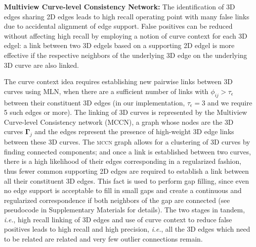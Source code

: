 \documentclass[a4paper,titlepage]{article}
\newcommand{\ie}{{\it i.e.}}
\newcommand{\Gama}{\boldsymbol{\Gamma}}
\newcommand{\mccn}{\textsc{mccn}\xspace}
\begin{document}

\textbf{Multiview Curve-level Consistency Network:}
The identification of 3D edges sharing 2D edges leads to
high recall operating point with many false links due to accidental alignment of
edge support. False positives can be reduced without affecting high
recall by employing a notion of curve context for each 3D edgel: a link
between two 3D edgels based on a supporting 2D edgel is more effective if
the respective neighbors of the underlying 3D edge on the underlying 3D curve
are also linked. 

The curve context idea requires establishing new pairwise links between 3D
curves using MLN, when there are a sufficient number of links with
$\phi_{ij}>\tau_{\epsilon}$ between their constituent 3D edges (in our
implementation, $\tau_{\epsilon}=3$ and we require 5 such edges or more). The
linking of 3D curves is represented by the Multiview Curve-level Consistency
network (MCCN), a graph whose nodes are the 3D curves $\Gama_j$ and the edges
represent the presence of high-weight 3D edge links between these 3D curves. The
\mccn graph allows for a clustering of 3D curves by finding connected
components; and once a link is established between two curves, there is a high
likelihood of their edges corresponding in a regularized fashion, thus
fewer common supporting 2D edges are required to establish a link between all
their constituent 3D edges. This fact is used to perform gap filling, since even
no edge support is acceptable to fill in small gaps and create a continuous and
regularized correspondence if both neighbors of the gap are connected (see
pseudocode in Supplementary Materials for details). The two stages in
tandem, \ie, high recall linking of 3D edges and use of curve context to reduce
false positives leads to high recall and high precision, \textit{i.e.}, all the
3D edges which need to be related are related and very few outlier connections
remain.
\end{document}
